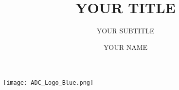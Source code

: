 \documentclass{beamer}
\title{YOUR TITLE}
\subtitle{YOUR SUBTITLE}
\author{YOUR NAME}
\institute{UMN ADC}
\begin{document}
\begin{frame}
    \titlepage
    \texttt{[image: ADC\_Logo\_Blue.png]}
\end{frame}
\end{document}
